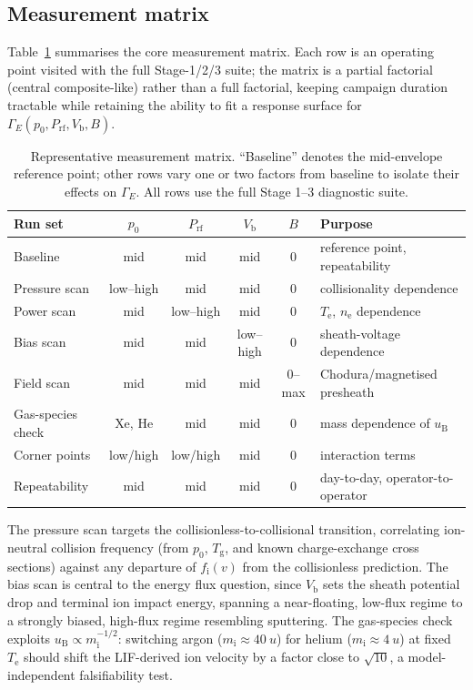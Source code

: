 \subsection{Measurement matrix}

Table~\ref{tab:doe-matrix} summarises the core measurement matrix. Each row is an operating point visited with the full Stage-1/2/3 suite; the matrix is a partial factorial (central composite-like) rather than a full factorial, keeping campaign duration tractable while retaining the ability to fit a response surface for $\Gamma_{E}(p_{0}, P_{\mathrm{rf}}, V_{\mathrm{b}}, B)$.

\begin{table}[htbp]
\centering
\caption{Representative measurement matrix. ``Baseline'' denotes the mid-envelope reference point; other rows vary one or two factors from baseline to isolate their effects on $\Gamma_{E}$. All rows use the full Stage 1--3 diagnostic suite.}
\label{tab:doe-matrix}
\begin{tabular}{@{}lccccl@{}}
\toprule
Run set & $p_{0}$ & $P_{\mathrm{rf}}$ & $V_{\mathrm{b}}$ & $B$ & Purpose \\
\midrule
Baseline & mid & mid & mid & 0 & reference point, repeatability \\
Pressure scan & low--high & mid & mid & 0 & collisionality dependence \\
Power scan & mid & low--high & mid & 0 & $T_{\mathrm{e}}$, $n_{\mathrm{e}}$ dependence \\
Bias scan & mid & mid & low--high & 0 & sheath-voltage dependence \\
Field scan & mid & mid & mid & 0--max & Chodura/magnetised presheath \\
Gas-species check & Xe, He & mid & mid & 0 & mass dependence of $u_{\mathrm{B}}$ \\
Corner points & low/high & low/high & mid & 0 & interaction terms \\
Repeatability & mid & mid & mid & 0 & day-to-day, operator-to-operator \\
\bottomrule
\end{tabular}
\end{table}

The pressure scan targets the collisionless-to-collisional transition, correlating ion-neutral collision frequency (from $p_{0}$, $T_{\mathrm{g}}$, and known charge-exchange cross sections) against any departure of $f_{\mathrm{i}}(v)$ from the collisionless prediction. The bias scan is central to the energy flux question, since $V_{\mathrm{b}}$ sets the sheath potential drop and terminal ion impact energy, spanning a near-floating, low-flux regime to a strongly biased, high-flux regime resembling sputtering. The gas-species check exploits $u_{\mathrm{B}} \propto m_{\mathrm{i}}^{-1/2}$: switching argon ($m_{\mathrm{i}} \approx \SI{40}{u}$) for helium ($m_{\mathrm{i}} \approx \SI{4}{u}$) at fixed $T_{\mathrm{e}}$ should shift the LIF-derived ion velocity by a factor close to $\sqrt{10}$, a model-independent falsifiability test.

